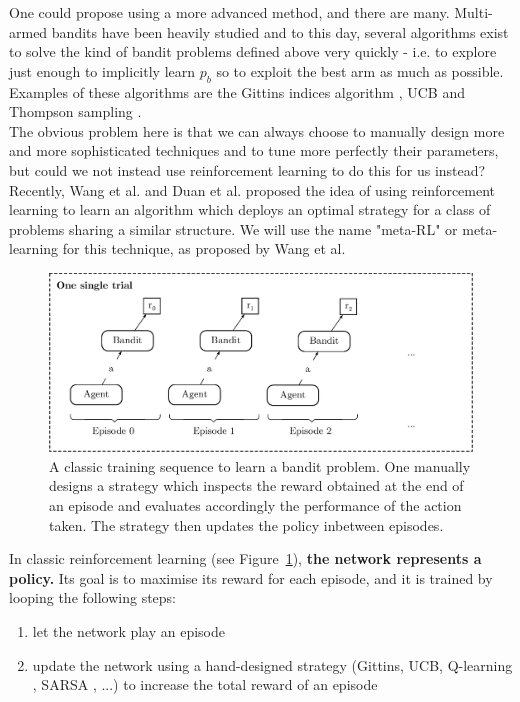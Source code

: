 One could propose using a more advanced method, and there are many. Multi-armed
bandits have been heavily studied and to this day, several algorithms exist to
solve the kind of bandit problems defined above very quickly - i.e. to explore
just enough to implicitly learn $p_b$ so to exploit the best arm as much as
possible. Examples of these algorithms are the Gittins indices algorithm
\cite{Gittins79banditprocesses},
UCB \cite{Auer:2002:FAM:599614.599677} and Thompson sampling
\cite{thompson1933}.\\

The obvious problem here is that we can always choose to manually design more
and more sophisticated techniques and to tune more perfectly their parameters,
but could we not instead use reinforcement learning to do this for us instead?\\

Recently, Wang et al. \cite{learningtorl} and Duan et al. \cite{fastrlviaslowrl}
proposed the idea of using reinforcement learning to learn an algorithm which
deploys an optimal strategy for a class of problems sharing a similar structure.
We will use the name "meta-RL" or meta-learning for this technique, as proposed 
by Wang et al. \\
\begin{figure}
	\centering
	\includegraphics[width=0.7\linewidth]{fig/normal_bandit_training.eps}
	\caption{A classic training sequence to learn a bandit problem. One
	manually designs a strategy which inspects the reward obtained at 
	the end of an episode and evaluates accordingly the performance of the action
	taken. The strategy then updates the policy inbetween episodes.}
	\label{fig:normal_bandit_training}
\end{figure}

In classic reinforcement learning (see Figure~\ref{fig:normal_bandit_training}),
\textbf{the network represents a policy.} Its goal is to maximise its reward
for each episode, and it is trained by looping the following steps:
\begin{enumerate}
	\item let the network play an episode
	\item update the network using a hand-designed strategy (Gittins, UCB,
		Q-learning \cite{qlearning}, SARSA \cite{sarsa}, ...) to 
		increase the total reward of an episode
\end{enumerate}

